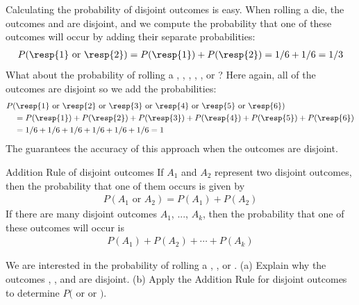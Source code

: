Calculating the probability of disjoint outcomes is easy. When rolling a die, the outcomes  and  are disjoint, and we compute the probability that one of these outcomes will occur by adding their separate probabilities:
\begin{align*}
P(\text{\resp{1} or \resp{2}})
  = P(\text{\resp{1}})+P(\text{\resp{2}})
  = 1/6 + 1/6
  = 1/3
\end{align*}
What about  the probability of rolling a , , , , , or ? Here again, all of the outcomes are disjoint so we add the probabilities:
\begin{align*}
&P(\text{\resp{1} or \resp{2} or \resp{3} or \resp{4}
    or \resp{5} or \resp{6}}) \\
  &\quad = P(\text{\resp{1}})+P(\text{\resp{2}})
      + P(\text{\resp{3}})+P(\text{\resp{4}})
      + P(\text{\resp{5}})+P(\text{\resp{6}}) \\
  &\quad = 1/6 + 1/6 + 1/6 + 1/6 + 1/6 + 1/6
  = 1
\end{align*}
The  guarantees the accuracy of this approach when the outcomes are disjoint. 

\begin{onebox}{Addition Rule of disjoint outcomes}
  If $A_1$ and $A_2$ represent two disjoint outcomes,
  then the probability that one of them occurs is given by
  \begin{align*}
  P(A_1\text{ or } A_2) = P(A_1) + P(A_2)
  \end{align*}
  If there are many disjoint outcomes $A_1$, ..., $A_k$,
  then the probability that one of these outcomes will occur is
  \begin{align*}
  P(A_1) + P(A_2) + \cdots + P(A_k)
  \end{align*}
\end{onebox}

\begin{exercisewrap}
\begin{nexercise}
We are interested in the probability of rolling a , , or . (a) Explain why the outcomes , , and  are disjoint. (b) Apply the Addition Rule for disjoint outcomes to determine $P($ or  or $)$.\footnotemark
\end{nexercise}
\end{exercisewrap}


